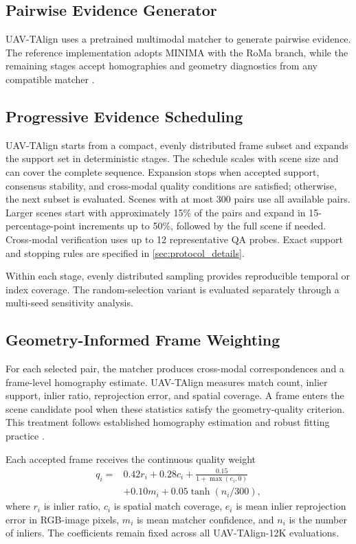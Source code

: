 \subsection{Pairwise Evidence Generator}

UAV-TAlign uses a pretrained multimodal matcher to generate pairwise evidence. The reference
implementation adopts MINIMA with the RoMa branch, while the remaining stages accept homographies
and geometry diagnostics from any compatible matcher
\cite{edstedt2024roma,ren2025minima}.

\subsection{Progressive Evidence Scheduling}

UAV-TAlign starts from a compact, evenly distributed frame subset and expands the support set in
deterministic stages. The schedule scales with scene size and can cover the complete sequence.
Expansion stops when accepted support, consensus stability, and cross-modal quality conditions are
satisfied; otherwise, the next subset is evaluated.
Scenes with at most 300 pairs use all available pairs. Larger scenes start with approximately
15\% of the pairs and expand in 15-percentage-point increments up to 50\%, followed by the full
scene if needed. Cross-modal verification uses up to 12 representative QA probes.
Exact support and stopping rules are specified in \ref{sec:protocol_details}.

Within each stage, evenly distributed sampling provides reproducible temporal or index coverage.
The random-selection variant is evaluated separately through a multi-seed sensitivity analysis.

\subsection{Geometry-Informed Frame Weighting}

For each selected pair, the matcher produces cross-modal correspondences and a frame-level
homography estimate. UAV-TAlign measures match count, inlier support, inlier ratio, reprojection
error, and spatial coverage. A frame enters the scene candidate pool when these statistics satisfy
the geometry-quality criterion. This treatment follows established homography estimation and robust
fitting practice
\cite{hartley2004multiple,fischler1981ransac,barath2019magsac,barath2020magsacpp}.

Each accepted frame receives the continuous quality weight
\begin{equation}
\begin{aligned}
q_i ={}& 0.42r_i + 0.28c_i + \frac{0.15}{1+\max(e_i,0)} \\
&+ 0.10m_i + 0.05\tanh(n_i/300),
\end{aligned}
\label{eq:frame_quality}
\end{equation}
where $r_i$ is inlier ratio, $c_i$ is spatial match coverage, $e_i$ is mean inlier reprojection
error in RGB-image pixels, $m_i$ is mean matcher confidence, and $n_i$ is the number of inliers.
The coefficients remain fixed across all UAV-TAlign-12K evaluations.

